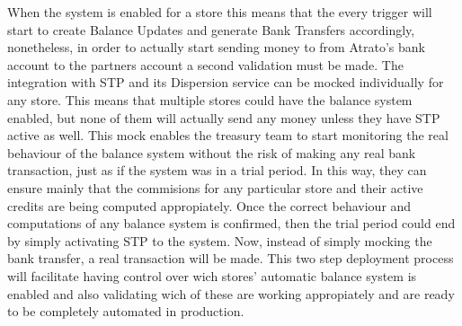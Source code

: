 When the system is enabled for a store this means that the every trigger will start to create Balance Updates and generate Bank Transfers accordingly, nonetheless, in order to actually start sending money to from Atrato's bank account to the partners account a second validation must be made. The integration with STP and its Dispersion service can be mocked individually for any store. This means that multiple stores could have the balance system enabled, but none of them will actually send any money unless they have STP active as well. This mock enables the treasury team to start monitoring the real behaviour of the balance system without the risk of making any real bank transaction, just as if the system was in a trial period. In this way, they can ensure mainly that the commisions for any particular store and their active credits are being computed appropiately. Once the correct behaviour and computations of any balance system is confirmed, then the trial period could end by simply activating STP to the system. Now, instead of simply mocking the bank transfer, a real transaction will be made. This two step deployment process will facilitate having control over wich stores' automatic balance system is enabled and also validating wich of these are working appropiately and are ready to be completely automated in production.
